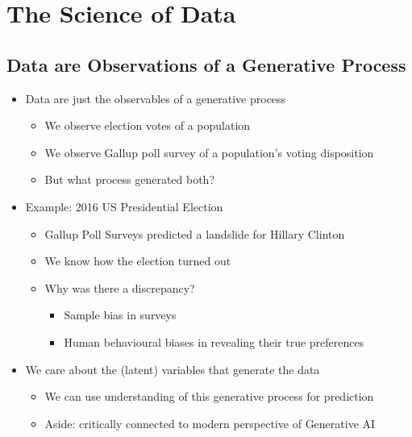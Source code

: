 \documentclass[11pt]{article}
\theoremstyle{definition}
\begin{document}
\section{The Science of Data}
\subsection{Data are Observations of a Generative Process}
\begin{itemize}
  \item Data are just the observables of a generative process
  \begin{itemize}
    \item We observe election votes of a population
    \item We observe Gallup poll survey of a population’s voting disposition
    \item But what process generated both?
  \end{itemize}
  \item Example: 2016 US Presidential Election
  \begin{itemize}
    \item Gallup Poll Surveys predicted a landslide for Hillary Clinton
    \item We know how the election turned out
    \item Why was there a discrepancy?
    \begin{itemize}
      \item Sample bias in surveys
      \item Human behavioural biases in revealing their true preferences
    \end{itemize}
  \end{itemize}
  \item We care about the (latent) variables that generate the data
  \begin{itemize}
    \item We can use understanding of this generative process for prediction
    \item Aside: critically connected to modern perspective of Generative AI
  \end{itemize}
\end{itemize}
\end{document}
